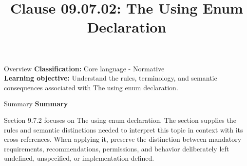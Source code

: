\documentclass[10pt,letterpaper]{article}
\title{Clause 09.07.02: The Using Enum Declaration}
\author{}
\date{}
\begin{document}
\maketitle
\begin{CornellOverviewBox}{Overview}
\textbf{Classification:} Core language - Normative\\[2pt]
\textbf{Learning objective:} Understand the rules, terminology, and semantic consequences associated with The using enum declaration.
\end{CornellOverviewBox}\begin{CornellSummaryBox}{Summary}
{\sffamily\bfseries\color{Accent} Summary}\par\vspace{3pt}Section 9.7.2 focuses on The using enum declaration. The section supplies the rules and semantic distinctions needed to interpret this topic in context with its cross-references. When applying it, preserve the distinction between mandatory requirements, recommendations, permissions, and behavior deliberately left undefined, unspecified, or implementation-defined.
\end{CornellSummaryBox}
\end{document}
